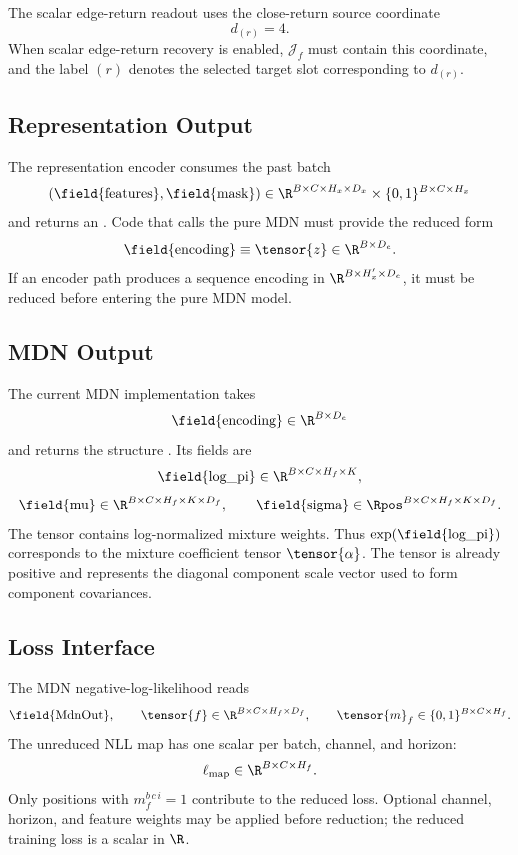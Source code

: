 The scalar edge-return readout uses the close-return source coordinate
\[
  d_{(r)}=4.
\]
When scalar edge-return recovery is enabled, $\mathcal{J}_f$ must contain this
coordinate, and the label $(r)$ denotes the selected target slot corresponding
to $d_{(r)}$.

\subsection{Representation Output}
\label{appsub:representation-output-contract}

The representation encoder consumes the past batch
\[
  (\text{\field{features}},\text{\field{mask}})
  \in
  \R^{B \times C \times H_x \times D_x}
  \times
  \{0,1\}^{B \times C \times H_x}
\]
and returns an .  Code that calls the pure MDN must provide the
reduced form
\[
  \text{\field{encoding}}
  \equiv
  \tensor{z}
  \in
  \R^{B \times D_e}.
\]
If an encoder path produces a sequence encoding in
$\R^{B \times H_x' \times D_e}$, it must be reduced before entering the pure
MDN model.

\subsection{MDN Output}
\label{appsub:mdn-output-contract}

The current MDN implementation takes
\[
  \text{\field{encoding}}
  \in
  \R^{B \times D_e}
\]
and returns the structure .  Its fields are
\[
  \text{\field{log\_pi}}
  \in
  \R^{B \times C \times H_f \times K},
\]
\[
  \text{\field{mu}}
  \in
  \R^{B \times C \times H_f \times K \times D_f},
  \qquad
  \text{\field{sigma}}
  \in
  \Rpos^{B \times C \times H_f \times K \times D_f}.
\]
The  tensor contains log-normalized mixture weights.  Thus
$\exp(\text{\field{log\_pi}})$ corresponds to the mixture coefficient tensor
$\tensor{\alpha}$.  The  tensor is already positive and represents
the diagonal component scale vector used to form component covariances.

\subsection{Loss Interface}
\label{appsub:loss-interface-contract}

The MDN negative-log-likelihood reads
\[
  \text{\field{MdnOut}},
  \qquad
  \tensor{f}
  \in
  \R^{B \times C \times H_f \times D_f},
  \qquad
  \tensor{m}_f
  \in
  \{0,1\}^{B \times C \times H_f}.
\]
The unreduced NLL map has one scalar per batch, channel, and horizon:
\[
  \ell_{\mathrm{map}}
  \in
  \R^{B \times C \times H_f}.
\]
Only positions with $m_f^{b\,c\,i}=1$ contribute to the reduced loss.  Optional
channel, horizon, and feature weights may be applied before reduction; the
reduced training loss is a scalar in $\R$.
